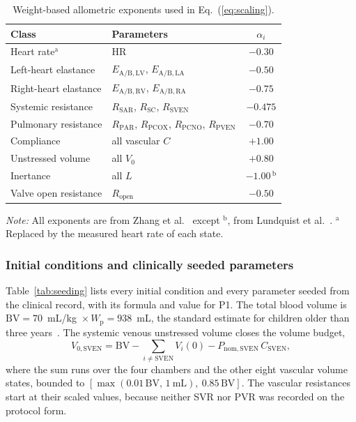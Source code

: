 \documentclass{article}
\begin{document}
\begin{table}[!htbp]
\centering\small
\caption{Weight-based allometric exponents used in Eq.~(\ref{eq:scaling}).}
\label{tab:exponents}
\begin{tabular}{llc}
\toprule
\textbf{Class} & \textbf{Parameters} & $\alpha_i$ \\
\midrule
Heart rate$^{\mathrm{a}}$ & HR & $-0.30$ \\
Left-heart elastance & $E_{\mathrm{A/B,LV}}$, $E_{\mathrm{A/B,LA}}$ & $-0.50$ \\
Right-heart elastance & $E_{\mathrm{A/B,RV}}$, $E_{\mathrm{A/B,RA}}$ & $-0.75$ \\
Systemic resistance & $R_{\mathrm{SAR}}$, $R_{\mathrm{SC}}$, $R_{\mathrm{SVEN}}$ & $-0.475$ \\
Pulmonary resistance & $R_{\mathrm{PAR}}$, $R_{\mathrm{PCOX}}$, $R_{\mathrm{PCNO}}$, $R_{\mathrm{PVEN}}$ & $-0.70$ \\
Compliance & all vascular $C$ & $+1.00$ \\
Unstressed volume & all $V_0$ & $+0.80$ \\
Inertance & all $L$ & $-1.00$\,$^{\mathrm{b}}$ \\
Valve open resistance & $R_{\mathrm{open}}$ & $-0.50$ \\
\bottomrule
\end{tabular}
\par\vspace{2pt}
\begin{minipage}{0.8\linewidth}
\raggedright\footnotesize
\emph{Note:} All exponents are from Zhang et al.~\cite{zhang2019multiscale} except $^{\mathrm{b}}$, from Lundquist et al.~\cite{Lundquist2025}. $^{\mathrm{a}}$Replaced by the measured heart rate of each state.
\end{minipage}
\end{table}

\subsubsection{Initial conditions and clinically seeded parameters}
Table~\ref{tab:seeding} lists every initial condition and every parameter seeded from the clinical record, with its formula and value for P1. The total blood volume is $\mathrm{BV} = 70$~mL/kg~$\times\,W_{\mathrm{p}} = 938$~mL, the standard estimate for children older than three years~\cite{Cote2024}. The systemic venous unstressed volume closes the volume budget,
\begin{equation}
V_{0,\mathrm{SVEN}} = \mathrm{BV} - \sum_{i \neq \mathrm{SVEN}} V_i(0) - P_{\mathrm{nom,SVEN}}\,C_{\mathrm{SVEN}},
\label{eq:sven}
\end{equation}
where the sum runs over the four chambers and the other eight vascular volume states, bounded to $[\max(0.01\,\mathrm{BV},\,1~\mathrm{mL}),\ 0.85\,\mathrm{BV}]$. The vascular resistances start at their scaled values, because neither SVR nor PVR was recorded on the protocol form.
\end{document}
